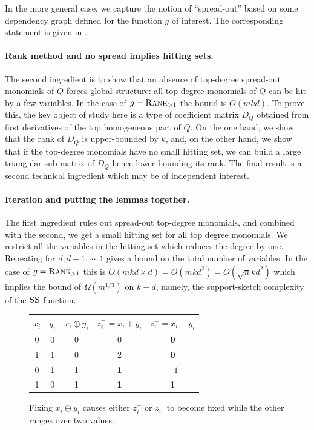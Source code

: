 \documentclass{article}
\begin{document}
In the more general case, we capture the notion of ``spread-out'' based on some dependency graph defined for the function $g$ of interest. The corresponding statement is given in  .

\paragraph{Rank method and no spread implies hitting sets.}
The second ingredient is to show that an absence of top-degree spread-out monomials of $Q$ forces global structure: all top-degree monomials of $Q$ can be hit by a few variables. In the case of $g = \operatorname{\textsc{Rank}}_{>1}$ the bound is $O(mkd)$.
To prove this, the key object of study here is a type of coefficient matrix $D_Q$ obtained from first derivatives of the top homogeneous part of $Q$. On the one hand, we show that the rank of $D_Q$ is upper-bounded by $k$, and, on the other hand, we show that if the top-degree monomials have no small hitting set, we can build a large triangular sub-matrix of $D_Q$ hence lower-bounding its rank. The final result is a second technical ingredient  which may be of independent interest. 

\paragraph{Iteration and putting the lemmas together.}
The first ingredient rules out spread-out top-degree monomials, and combined with the second, we get a small hitting set for all top degree monomials. We restrict all the variables in the hitting set which reduces the degree by one. Repeating for $d,d-1,\cdots,1$ gives a bound on the total number of variables. In the case of $g=\operatorname{\textsc{Rank}}_{>1}$ this is $O(mkd\times d) = O(mkd^2) = O(\sqrt{n}kd^2)$ which implies the bound of $\Omega(m^{1/3})$ on $k+d$, namely, the support-sketch complexity of the $\operatorname{\textsc{SS}}$ function.


\begin{figure}[t]
    \centering
    \def\arraystretch{1.2}
    \setlength\tabcolsep{.6em}
    \begin{tabular}{cc|c|cc}
    $x_i$ & $y_i$ & $x_i \oplus y_i$ & $z^+_i=x_i+y_i$ & $z^-_i=x_i-y_i$ \\
    \hline
    0 & 0 & 0 & 0 & \textbf{0} \\
    1 & 1 & 0 & 2 & \textbf{0} \\
    \hline
    0 & 1 & 1 & \textbf{1} & $-1$ \\
    1 & 0 & 1 & \textbf{1} & 1
    \end{tabular}
    \caption{Fixing $x_i\oplus y_i$ causes either $z^+_i$ or $z^-_i$ to become fixed while the other ranges over two values.}
    \label{fig:fixings}
\end{figure}
\end{document}
